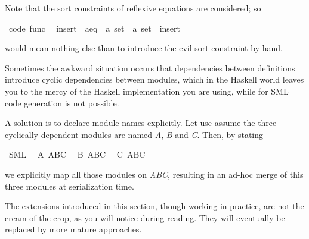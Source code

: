 \begin{isabellebody}
\begin{isamarkuptext}
  Note that the sort constraints of reflexive equations
  are considered; so%
\end{isamarkuptext}%
\isamarkuptrue%
\isamarkupfalse%
\ {\isacharbrackleft}code\ func{\isacharbrackright}{\isacharcolon}\isanewline
\ \ {\isachardoublequoteopen}{\isacharparenleft}insert\ {\isasymColon}\ {\isacharprime}a{\isasymColon}eq\ {\isasymRightarrow}\ {\isacharprime}a\ set\ {\isasymRightarrow}\ {\isacharprime}a\ set{\isacharparenright}\ {\isacharequal}\ insert{\isachardoublequoteclose}%
\isadelimproof
\ %
\endisadelimproof
%
\isatagproof
\isacommand{{\isachardot}{\isachardot}}\isamarkupfalse%
%
\endisatagproof
{\isafoldproof}%
%
\isadelimproof
%
\endisadelimproof
%
\begin{isamarkuptext}%
would mean nothing else than to introduce the evil
  sort constraint by hand.%
\end{isamarkuptext}%
\isamarkuptrue%
%
\isamarkuptrue%
%
\begin{isamarkuptext}%
Sometimes the awkward situation occurs that dependencies
  between definitions introduce cyclic dependencies
  between modules, which in the Haskell world leaves
  you to the mercy of the Haskell implementation you are using,
  while for SML code generation is not possible.

  A solution is to declare module names explicitly.
  Let use assume the three cyclically dependent
  modules are named \emph{A}, \emph{B} and \emph{C}.
  Then, by stating%
\end{isamarkuptext}%
\isamarkuptrue%
\isamarkupfalse%
\ SML\isanewline
\ \ A\ ABC\isanewline
\ \ B\ ABC\isanewline
\ \ C\ ABC%
\begin{isamarkuptext}%
we explicitly map all those modules on \emph{ABC},
  resulting in an ad-hoc merge of this three modules
  at serialization time.%
\end{isamarkuptext}%
\isamarkuptrue%
%
\isamarkuptrue%
%
\begin{isamarkuptext}%
\begin{warn}
    The extensions introduced in this section, though working
    in practice, are not the cream of the crop, as you
    will notice during reading.  They will
    eventually be replaced by more mature approaches.
  \end{warn}


\end{isamarkuptext}
\end{isabellebody}
